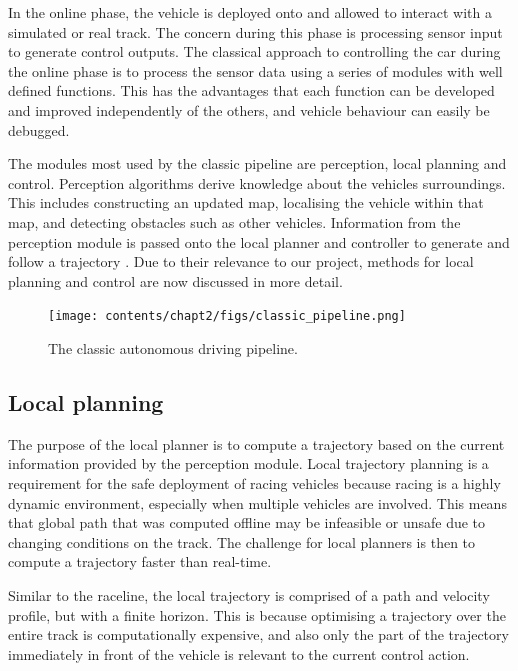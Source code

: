 In the online phase, the vehicle is deployed onto and allowed to interact with a simulated or real track.
The concern during this phase is processing sensor input to generate control outputs.
The classical approach to controlling the car during the online phase is to process the sensor data using a series of modules with well defined functions.
This has the advantages that each function can be developed and improved independently of the others, and vehicle behaviour can easily be debugged.

The modules most used by the classic pipeline are perception, local planning and control.
Perception algorithms derive knowledge about the vehicles surroundings. 
This includes constructing an updated map, localising the vehicle within that map, and detecting obstacles such as other vehicles. 
Information from the perception module is passed onto the local planner and controller to generate and follow a trajectory  \cite{Betz2021}.
Due to their relevance to  our project, methods for local planning and control are now discussed in more detail. 

\begin{figure}[h]
    \centering
    \texttt{[image: contents/chapt2/figs/classic\_pipeline.png]}
    \caption{The classic autonomous driving pipeline.}
    \label{fig:full_stack}
\end{figure}


\subsection{Local planning}
\label{sec:trajectory_planning}

The purpose of the local planner is to compute a trajectory based on the current information provided by the perception module.
Local trajectory planning is a requirement for the safe deployment of racing vehicles because racing is a highly dynamic environment, especially when multiple vehicles are involved.
This means that global path that was computed offline may be infeasible or unsafe due to changing conditions on the track.
The challenge for local planners is then to compute a trajectory faster than real-time.

Similar to the raceline, the local trajectory is comprised of a path and velocity profile, but with a finite horizon. 
This is because optimising a trajectory over the entire track is computationally expensive, and also only the part of the trajectory immediately in front of the vehicle is relevant to the current control action.

